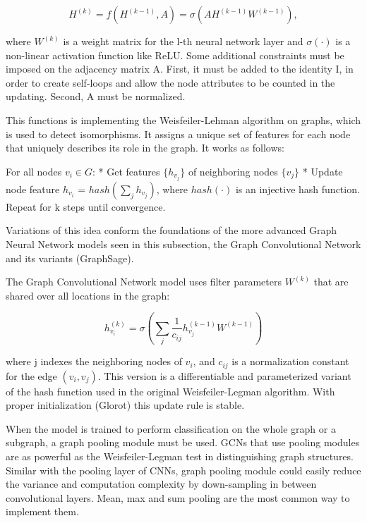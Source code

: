 $$H^{(k)} = f(H^{(k-1)},A) =  \sigma(AH^{(k-1)}W^{(k-1)}),$$

where $W^{(k)}$ is a weight matrix for the l-th neural network layer and $\sigma(·)$ is a non-linear activation function like ReLU. Some additional constraints must be imposed on the adjacency matrix A. First, it must be added to the identity I, in order to create self-loops and allow the node attributes to be counted in the updating. Second, A must be normalized.

This functions is implementing the Weisfeiler-Lehman algorithm on graphs, which is used to detect isomorphisms. It assigns a unique set of features for each node that uniquely describes its role in the graph. It works as follows:

For all nodes $v_i \in G$:
* Get features $\{ h_v_j \}$ of neighboring nodes $\{ v_j \}$
* Update node feature $h_{v_i}$ = $hash(\sum_j h_v_j)$, where $hash(\cdot)$ is an injective hash function.
Repeat for k steps until convergence.

Variations of this idea conform the foundations of the more advanced Graph Neural Network models seen in this subsection, the Graph Convolutional Network and its variants (GraphSage).


The Graph Convolutional Network model uses filter parameters $W^{(k)}$ that are shared over all locations in the graph:

$$ h^{(k)}_{v_i} = \sigma(\sum_j \frac{1}{c_{ij}}h^{(k-1)}_{v_j}W^{(k-1)})$$

where j indexes the neighboring nodes of $v_i$, and $c_{ij}$ is a normalization constant for the edge $(v_i,v_j)$. This version is a differentiable and parameterized variant of the hash function used in the original Weisfeiler-Legman algorithm. With proper initialization (Glorot) this update rule is stable.






When the model is trained to perform classification on the whole graph or a subgraph, a graph pooling module must be used. GCNs that use pooling modules are as powerful as the Weisfeiler-Legman test in distinguishing graph structures. Similar with the pooling layer of CNNs, graph pooling module could easily reduce the variance and computation complexity by down-sampling in between convolutional layers. Mean, max and sum pooling are the most common way to implement them.


